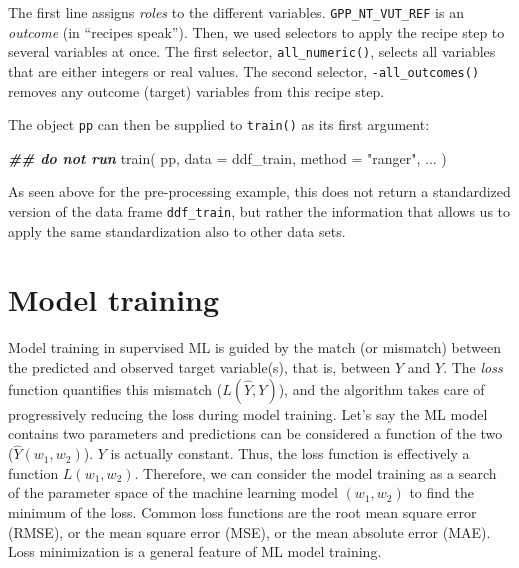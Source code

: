 \documentclass[
]{book}
\newenvironment{Shaded}{\begin{snugshade}}{\end{snugshade}}
\newcommand{\AttributeTok}[1]{\textcolor[rgb]{0.77,0.63,0.00}{#1}}
\newcommand{\DocumentationTok}[1]{\textcolor[rgb]{0.56,0.35,0.01}{\textbf{\textit{#1}}}}
\newcommand{\FunctionTok}[1]{\textcolor[rgb]{0.00,0.00,0.00}{#1}}
\newcommand{\NormalTok}[1]{#1}
\newcommand{\StringTok}[1]{\textcolor[rgb]{0.31,0.60,0.02}{#1}}
\begin{document}
The first line assigns \emph{roles} to the different variables. \texttt{GPP\_NT\_VUT\_REF} is an \emph{outcome} (in ``recipes speak''). Then, we used selectors to apply the recipe step to several variables at once. The first selector, \texttt{all\_numeric()}, selects all variables that are either integers or real values. The second selector, \texttt{-all\_outcomes()} removes any outcome (target) variables from this recipe step.

The object \texttt{pp} can then be supplied to \texttt{train()} as its first argument:

\begin{Shaded}
\begin{Highlighting}[]
\DocumentationTok{\#\# do not run}
\FunctionTok{train}\NormalTok{(}
\NormalTok{  pp, }
  \AttributeTok{data =}\NormalTok{ ddf\_train, }
  \AttributeTok{method =} \StringTok{"ranger"}\NormalTok{,}
\NormalTok{  ...}
\NormalTok{)}
\end{Highlighting}
\end{Shaded}

As seen above for the pre-processing example, this does not return a standardized version of the data frame \texttt{ddf\_train}, but rather the information that allows us to apply the same standardization also to other data sets.

\hypertarget{training}{%
\chapter{Model training}\label{training}}

Model training in supervised ML is guided by the match (or mismatch) between the predicted and observed target variable(s), that is, between \(\hat{Y}\) and \(Y\). The \emph{loss} function quantifies this mismatch (\(L(\hat{Y}, Y)\)), and the algorithm takes care of progressively reducing the loss during model training. Let's say the ML model contains two parameters and predictions can be considered a function of the two (\(\hat{Y}(w_1, w_2)\)). \(Y\) is actually constant. Thus, the loss function is effectively a function \(L(w_1, w_2)\). Therefore, we can consider the model training as a search of the parameter space of the machine learning model \((w_1, w_2)\) to find the minimum of the loss. Common loss functions are the root mean square error (RMSE), or the mean square error (MSE), or the mean absolute error (MAE). Loss minimization is a general feature of ML model training.
\end{document}
